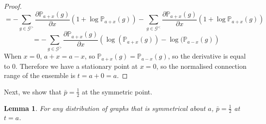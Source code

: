 \documentclass{article}
\newtheorem{lemma}{Lemma}
\begin{document}
\begin{proof}
\begin{equation}
        = -\sum_{g\in\mathcal{G}^>} \frac{\partial \mathbb{P}_{a+x}(g)}{\partial x}\left(1+\log \mathbb{P}_{a+x}(g) \right)-\sum_{g\in\mathcal{G}^<} \frac{\partial \mathbb{P}_{a+x}(g)}{\partial x}\left(1+\log \mathbb{P}_{a+x}(g) \right)
    \end{equation}
    \begin{equation}
        = -\sum_{g\in\mathcal{G}^>} \frac{\partial \mathbb{P}_{a+x}(g)}{\partial x}\left(\log(\mathbb{P}_{a+x}(g)) - \log(\mathbb{P}_{a-x}(g)\right)
    \end{equation}
    When $x=0$, $a+x = a-x$, so $\mathbb{P}_{a+x}(g) = \mathbb{P}_{a-x}(g)$, so the derivative is equal to 0. Therefore we have a stationary point at $x=0$, so the normalised connection range of the ensemble is $t = a+0 = a$.
\end{proof}
Next, we show that $\bar{p}=\frac{1}{2}$ at the symmetric point.
\begin{lemma}
    \label{lem:second}
    For any distribution of graphs that is symmetrical about $a$, $\bar{p}=\frac{1}{2}$ at $t=a$.
\end{lemma}
\end{document}
